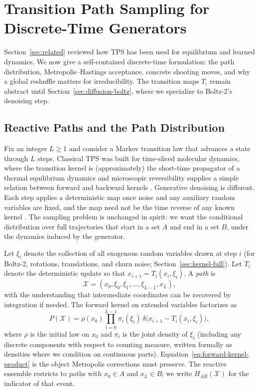 \section{Transition Path Sampling for Discrete-Time Generators}
\label{sec:tps-foundations}

Section~\ref{sec:related} reviewed how TPS has been used for equilibrium and
learned dynamics. We now give a self-contained discrete-time formulation: the
path distribution, Metropolis--Hastings acceptance, concrete shooting moves, and
why a global reshuffle matters for irreducibility. The transition maps $T_i$
remain abstract until Section~\ref{sec:diffusion-boltz}, where we specialize to
Boltz-2's denoising step.

\subsection{Reactive Paths and the Path Distribution}

Fix an integer $L \geq 1$ and consider a Markov transition law that advances a state through $L$ steps. Classical TPS was built for time-sliced molecular dynamics, where the transition kernel is (approximately) the short-time propagator of a thermal equilibrium dynamics and microscopic reversibility supplies a simple relation between forward and backward kernels \citep{dellago1998,bolhuis2002}. Generative denoising is different. Each step applies a deterministic map once noise and any auxiliary random variables are fixed, and the map need not be the time reverse of any known kernel \citep{buijsman2020}. The sampling problem is unchanged in spirit: we want the conditional distribution over full trajectories that start in a set $A$ and end in a set $B$, under the dynamics induced by the generator.

Let $\xi_i$ denote the collection of all exogenous random variables drawn at step $i$ (for Boltz-2, rotations, translations, and churn noise; Section~\ref{sec:kernel-full}). Let $T_i$ denote the deterministic update so that $x_{i+1} = T_i(x_i, \xi_i)$. A \emph{path} is
\[
  \mathcal{X} = (x_0, \xi_0, \xi_1, \ldots, \xi_{L-1}, x_L),
\]
with the understanding that intermediate coordinates can be recovered by integration if needed. The forward kernel on extended variables factorizes as
\begin{equation}
  \label{eq:forward-kernel-product}
  P(\mathcal{X}) = \rho(x_0) \prod_{i=0}^{L-1} \pi_i(\xi_i)\,
  \delta\bigl(x_{i+1} - T_i(x_i, \xi_i)\bigr),
\end{equation}
where $\rho$ is the initial law on $x_0$ and $\pi_i$ is the joint density of $\xi_i$ (including any discrete components with respect to counting measure, written formally as densities where we condition on continuous parts). Equation~\eqref{eq:forward-kernel-product} is the object Metropolis corrections must preserve. The reactive ensemble restricts to paths with $x_0 \in A$ and $x_L \in B$; we write $H_{AB}(\mathcal{X})$ for the indicator of that event.

